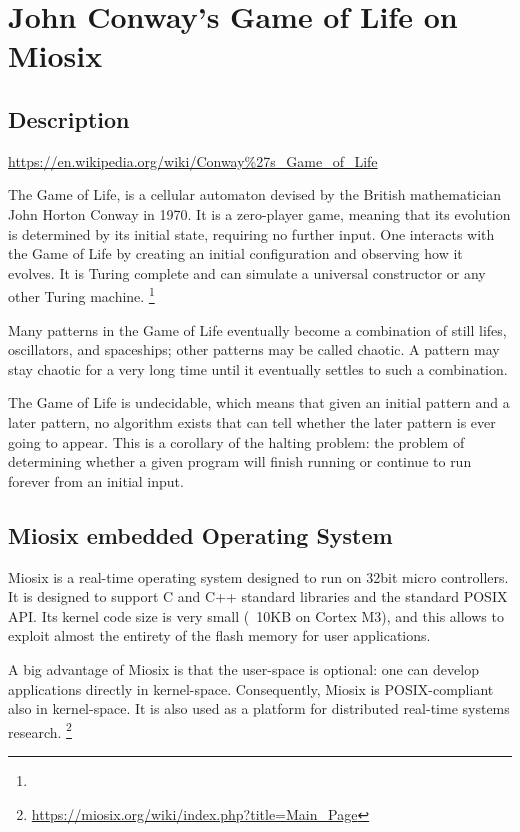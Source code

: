 \documentclass[10pt]{article}
\begin{document}
\section{John Conway's Game of Life on Miosix}

\subsection{Description }

\urldef{\wikiUrl}\url{https://en.wikipedia.org/wiki/Conway\%27s_Game_of_Life}

The Game of Life, is a cellular automaton devised by the British mathematician John Horton Conway in 1970. 
It is a zero-player game, meaning that its evolution is determined by its initial state, requiring no further input. 
One interacts with the Game of Life by creating an initial configuration and observing how it evolves.
It is Turing complete and can simulate a universal constructor or any other Turing machine. \footnote{\wikiUrl }

Many patterns in the Game of Life eventually become a combination of still lifes, oscillators, and spaceships; other patterns may be called chaotic. A pattern may stay chaotic for a very long time until it eventually settles to such a combination.

The Game of Life is undecidable, which means that given an initial pattern and a later pattern, no algorithm exists that can tell whether the later pattern is ever going to appear.
This is a corollary of the halting problem: the problem of determining whether a given program will finish running or continue to run forever from an initial input.

\subsection{Miosix embedded Operating System}
Miosix is a real-time operating system designed to run on 32bit micro controllers. 
It is designed to support C and C++ standard libraries and the standard POSIX API. Its kernel code size is very small (~10KB on Cortex M3), and this
allows to exploit almost the entirety of the flash memory for user applications.

A big advantage of Miosix is that the user-space is optional: one can develop applications directly in kernel-space. Consequently, Miosix is POSIX-compliant also in kernel-space. It is also used as a platform for distributed real-time systems research. \footnote{\url{https://miosix.org/wiki/index.php?title=Main\_Page}}
\end{document}
